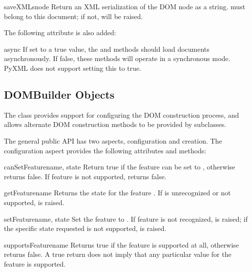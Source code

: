 \documentclass{howto}
\begin{document}
\begin{methoddesc}[DocumentLS]{saveXML}{snode}
  Return an XML serialization of the DOM node  as a
  string.   must belong to this document; if not,
   will be raised.
\end{methoddesc}

The following attribute is also added:

\begin{memberdesc}[DocumentLS]{async}
  If set to a true value, the  and 
  methods should load documents asynchronously.  If false, these
  methods will operate in a synchronous mode.
  PyXML does not support setting this to true.
\end{memberdesc}


\subsection{DOMBuilder Objects}

The  class provides support for configuring the DOM
construction process, and allows alternate DOM construction methods to
be provided by subclasses.

The general public API has two aspects, configuration and
 creation.  The configuration aspect provides the
following attributes and methods:

\begin{methoddesc}[DOMBuilder]{canSetFeature}{name, state}
  Return true if the feature  can be set to ,
  otherwise returns false.  If feature  is not supported,
  returns false.
\end{methoddesc}

\begin{methoddesc}[DOMBuilder]{getFeature}{name}
  Returns the state for the feature .  If  is
  unrecognized or not supported,  is
  raised.
\end{methoddesc}

\begin{methoddesc}[DOMBuilder]{setFeature}{name, state}
  Set the feature  to .  If feature  is
  not recognized,  is raised; if the
  specific state requested is not supported,
   is raised.
\end{methoddesc}

\begin{methoddesc}[DOMBuilder]{supportsFeature}{name}
  Returns true if the feature  is supported at all,
  otherwise returns false.  A true return does not imply that any
  particular value for the feature is supported.
\end{methoddesc}
\end{document}
